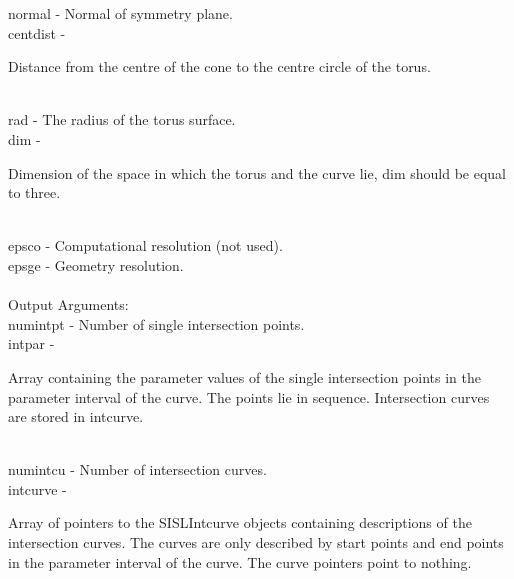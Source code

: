         \>\>    {\fov normal}   \> - \> Normal of symmetry plane.\\
        \>\>    {\fov centdist}\> - \>  \begin{minipg2}
                                Distance from the centre of the cone to the centre circle of the torus.
                                \end{minipg2}\\[0.8ex]
        \>\>    {\fov rad}      \> - \> The radius of the torus surface.\\
        \>\>    {\fov dim}      \> - \> \begin{minipg2}
                                Dimension of the space in which the
                                torus and the curve
                                lie, dim should be equal to  three.
                                \end{minipg2}\\[0.3ex]
        \>\>    {\fov epsco}    \> - \> Computational resolution (not used).\\
        \>\>    {\fov epsge}    \> - \> Geometry resolution.\\
\\
        \>Output Arguments:\\
        \>\>    {\fov numintpt}\> - \>  Number of single intersection points.\\
        \>\>    {\fov intpar}   \> - \> \begin{minipg2}
                        Array containing the parameter values of the
                        single intersection points in the parameter
                        interval of the curve. The points lie in sequence.
                        Intersection curves are stored in intcurve.
                                \end{minipg2}\\[0.8ex]
        \>\>    {\fov numintcu}\> - \>Number of intersection curves.\\
        \>\>    {\fov intcurve}\> - \>  \begin{minipg2}
                        Array of pointers to the SISLIntcurve objects
                        containing descriptions of the intersection
                        curves. The curves are only described by start
                        points and end points in
                        the parameter interval of the curve. The curve
                        pointers point to nothing.
                                \end{minipg2}\\[0.8ex]
